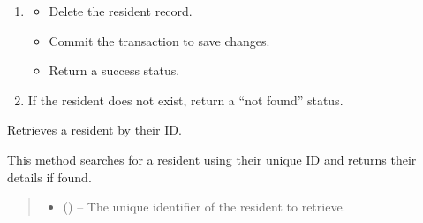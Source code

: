 \documentclass[letterpaper,10pt,english]{sphinxmanual}
\begin{document}
\begin{fulllineitems}
\begin{fulllineitems}
\begin{description}
\begin{enumerate}
\item {} \begin{description}
\begin{itemize}
\item {} 
\sphinxAtStartPar
Delete the resident record.

\item {} 
\sphinxAtStartPar
Commit the transaction to save changes.

\item {} 
\sphinxAtStartPar
Return a success status.

\end{itemize}

\end{description}

\item {} 
\sphinxAtStartPar
If the resident does not exist, return a “not found” status.

\end{enumerate}

\end{description}

\end{fulllineitems}


\begin{fulllineitems}
\label{\detokenize{app.controllers:app.controllers.resident_controller.ResidentController.getResidentById}}
\pysigstartsignatures
\pysiglinewithargsret
{}
{\sphinxparamcomma {}}
{}
\pysigstopsignatures
\sphinxAtStartPar
Retrieves a resident by their ID.

\sphinxAtStartPar
This method searches for a resident using their unique ID and returns their details
if found.
\begin{quote}\begin{description}
\begin{itemize}
\item {} 
\sphinxAtStartPar
{} () – The unique identifier of the resident to retrieve.


\end{itemize}
\end{description}
\end{quote}
\end{fulllineitems}
\end{fulllineitems}
\end{document}
